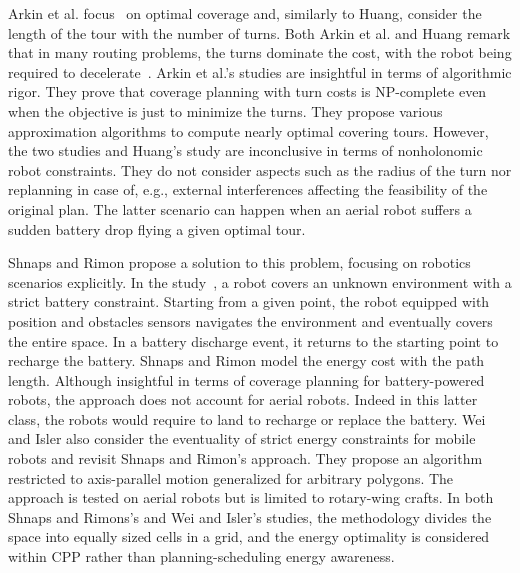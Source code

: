 Arkin et al. focus~\citep{arkin2001optimal,arkin2005optimal} on optimal coverage and, similarly to Huang, consider the length of the tour with the number of turns. Both Arkin et al. and Huang remark that in many routing problems, the turns dominate the cost, with the robot being required to decelerate~\citep{arkin2001optimal}. Arkin et al.'s studies are insightful in terms of algorithmic rigor. They prove that coverage planning with turn costs is NP-complete even when the objective is just to minimize the turns. They propose various approximation algorithms to compute nearly optimal covering tours. However, the two studies and Huang's study are inconclusive in terms of nonholonomic robot constraints. They do not consider aspects such as the radius of the turn nor replanning in case of, e.g., external interferences affecting the feasibility of the original plan. The latter scenario can happen when an aerial robot suffers a sudden battery drop flying a given optimal tour.

Shnaps and Rimon propose a solution to this problem, focusing on robotics scenarios explicitly. In the study~\citep{shnaps2016online}, a robot covers an unknown environment with a strict battery constraint. Starting from a given point, the robot equipped with position and obstacles sensors navigates the environment and eventually covers the entire space. In a battery discharge event, it returns to the starting point to recharge the battery. Shnaps and Rimon model the energy cost with the path length. %
Although insightful in terms of coverage planning for battery-powered robots, the approach does not account for aerial robots. Indeed in this latter class, the robots would require to land to recharge or replace the battery. Wei and Isler also consider the eventuality of strict energy constraints for mobile robots and revisit Shnaps and Rimon's approach. They propose an algorithm~\citep{wei2018coverage} restricted to axis-parallel motion generalized for arbitrary polygons. The approach is tested on aerial robots but is limited to rotary-wing crafts. In both Shnaps and Rimons's and Wei and Isler's studies, the methodology divides the space into equally sized cells in a grid, and the energy optimality is considered within CPP rather than planning-scheduling energy awareness.


